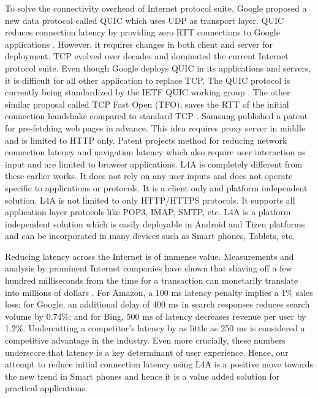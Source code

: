 \begin{multicols}{2}
To solve the connectivity overhead of Internet protocol suite, Google proposed a new data protocol called QUIC which uses UDP as transport layer. QUIC reduces connection latency by providing zero RTT connections to Google applications \cite{art1-key18}. However, it requires changes in both client and server for deployment. TCP evolved over decades and dominated the current Internet protocol suite. Even though Google deploys QUIC in its applications and  servers, it is difficult for all other application to replace TCP. The QUIC protocol is currently being standardized by the IETF QUIC working group \cite{art1-key19}. The other similar proposal called TCP Fast Open (TFO), saves the RTT of the initial connection handshake compared to standard TCP \cite{art1-key20}. Samsung published a patent \cite{art1-key21} for pre-fetching web pages in advance. This idea requires proxy server in middle and is limited to HTTP only. Patent \cite{art1-key22} projects method for reducing network connection latency and navigation latency which also require user interaction as input and are limited to browser applications. L4A is completely different from these earlier works. It does not rely on any user inputs and does not operate specific to applications or protocols. It is a client only and platform independent solution.  L4A is not limited to only HTTP/HTTPS protocols. It supports all application layer protocols like POP3, IMAP, SMTP, etc. L4A is a platform independent solution which is easily deployable in Android and Tizen platforms and can be incorporated in many devices such as Smart phones, Tablets, etc.

Reducing latency across the Internet is of immense value. Measurements and analysis by prominent Internet companies have shown that shaving off a few hundred milliseconds from the time for a transaction can monetarily translate into millions of dollars \cite{art1-key23}. For Amazon, a 100 ms latency penalty implies a 1$\%$ sales loss; for Google, an additional delay of 400 ms in search responses reduces search volume by 0.74$\%$; and for Bing, 500 ms of latency decreases revenue per user by 1.2$\%$. Undercutting a competitor’s latency by as little as 250 ms is considered a competitive advantage in the industry. Even more crucially, these numbers underscore that latency is a key determinant of user experience. Hence, our attempt to reduce initial connection latency using L4A is a positive move towards the new trend in Smart phones and hence it is a value added solution for practical applications. 


\end{multicols}
